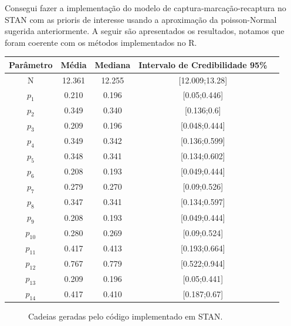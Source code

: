 \documentclass[a4paper,12pt,twoside]{article}
\begin{document}
Consegui fazer a implementação do modelo de captura-marcação-recaptura no STAN com as prioris de interesse usando a aproximação da poisson-Normal sugerida anteriormente. A seguir são apresentados os resultados, notamos que foram coerente com os métodos implementados no R.
\nocite{stan}
\begin{table}[ht]
\centering
\begin{tabular}{ccccc}
  \hline
Parâmetro & Média & Mediana & Intervalo de Credibilidade 95\% \\ 
  \hline
 N & 12.361 & 12.255 & [12.009;13.28] \\ 
 $p_1$ & 0.210 & 0.196 & [0.05;0.446] \\ 
 $p_2$ & 0.349 & 0.340 & [0.136;0.6] \\ 
$p_3$ & 0.209 & 0.196 & [0.048;0.444] \\ 
 $p_4$ & 0.349 & 0.342 & [0.136;0.599] \\ 
 $p_5$ & 0.348 & 0.341 & [0.134;0.602] \\ 
 $p_6$ & 0.208 & 0.193 & [0.049;0.444] \\ 
 $p_7$ & 0.279 & 0.270 & [0.09;0.526] \\ 
 $p_8$ & 0.347 & 0.341 & [0.134;0.597] \\ 
$p_9$ & 0.208 & 0.193 & [0.049;0.444] \\ 
 $p_{10}$ & 0.280 & 0.269 & [0.09;0.524] \\ 
$p_{11}$ & 0.417 & 0.413 & [0.193;0.664] \\ 
$p_{12}$ & 0.767 & 0.779 & [0.522;0.944] \\ 
 $p_{13}$ & 0.209 & 0.196 & [0.05;0.441] \\ 
 $p_{14}$ & 0.417 & 0.410 & [0.187;0.67] \\ 
   \hline
\end{tabular}
\end{table}

\begin{figure}[H]
  \centering

  \captionsetup{font=footnotesize,width=15cm}
  \caption{\small Cadeias geradas pelo código implementado em STAN.}
\end{figure}
\newpage
\end{document}
